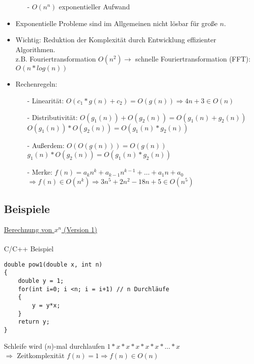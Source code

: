 \begin{itemize}
\begin{itemize}
\item[-] $O(n^n)$ exponentieller Aufwand
\end{itemize}
\item Exponentielle Probleme sind im Allgemeinen nicht lösbar für große $n$.
\item Wichtig: Reduktion der Komplexität durch Entwicklung effizienter Algorithmen.\\
z.B. Fouriertransformation $O(n^2) \rightarrow$ schnelle Fouriertransformation (FFT): $O(n*log(n))$
\item Rechenregeln:
\begin{itemize}
\item[-] Linearität: $O(c_1*g(n)+c_2) = O(g(n)) \Rightarrow 4n+3 \in O(n)$
\item[-] Distributivität: $O(g_1(n)) + O(g_2(n)) = O(g_1(n) +g_2(n))$ \\
$O(g_1(n))*O(g_2(n)) = O(g_1(n)*g_2(n))$
\item[-] Außerdem: $O(O(g(n))) = O(g(n))$ \\
$g_1(n)*O(g_2(n)) = O(g_1(n)*g_2(n))$
\item[-] Merke: $f(n) = a_kn^k + a_{k-1}n^{k-1} + \dots + a_1n + a_0$ \\
$\Rightarrow f(n) \in O(n^k) \Rightarrow 3n^5 + 2n^2 - 18n +5 \in O(n^5)$
\end{itemize}
\end{itemize}

\subsection{Beispiele}
\underline{Berechnung von $x^n$ (Version 1)} \\
~\\
C/C++ Beispiel
\begin{lstlisting}
double pow1(double x, int n)
{
	double y = 1;
	for(int i=0; i <n; i = i+1) // n Durchläufe
	{
		y = y*x;
	}
	return y;
}
\end{lstlisting}
Schleife wird ($n$)-mal durchlaufen $1*x*x*x*x*x*\dots *x$ \\
$\Rightarrow$ Zeitkomplexität $f(n)=1 \Rightarrow f(n) \in O(n)$

